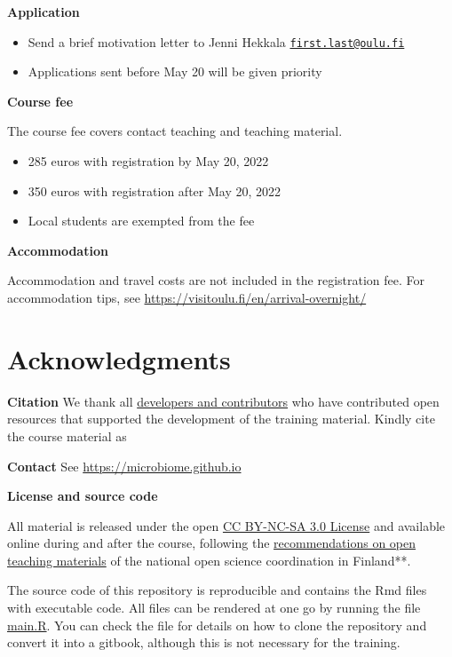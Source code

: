 \documentclass[
  oneside]{book}
\providecommand{\tightlist}{%
  \setlength{\itemsep}{0pt}\setlength{\parskip}{0pt}}
\begin{document}
\textbf{Application}

\begin{itemize}
\tightlist
\item
  Send a brief motivation letter to Jenni Hekkala \href{mailto:first.last@oulu.fi}{\nolinkurl{first.last@oulu.fi}}
\item
  Applications sent before May 20 will be given priority
\end{itemize}

\textbf{Course fee}

The course fee covers contact teaching and teaching material.

\begin{itemize}
\tightlist
\item
  285 euros with registration by May 20, 2022
\item
  350 euros with registration after May 20, 2022
\item
  Local students are exempted from the fee
\end{itemize}

\textbf{Accommodation}

Accommodation and travel costs are not included in the registration fee. For
accommodation tips, see \url{https://visitoulu.fi/en/arrival-overnight/}

\hypertarget{acknowledgments}{%
\section{Acknowledgments}\label{acknowledgments}}

\textbf{Citation} We thank all \href{https://microbiome.github.io}{developers and contributors} who have contributed open resources that supported the development of the training material. Kindly cite the course material as \citet{miacourse}

\textbf{Contact} See \url{https://microbiome.github.io}

\textbf{License and source code}

All material is released under the open \href{LICENSE}{CC BY-NC-SA 3.0 License} and available online during and after the course, following the \href{https://avointiede.fi/fi/linjaukset-ja-aineistot/kotimaiset-linjaukset/oppimisen-ja-oppimateriaalien-avoimuuden-linjaus}{recommendations on open teaching materials} of the national open science coordination in Finland**.

The source code of this repository is reproducible and contains
the Rmd files with executable code. All files can be rendered at one
go by running the file \url{main.R}. You can check the file for
details on how to clone the repository and convert it into a gitbook,
although this is not necessary for the training.
\end{document}

